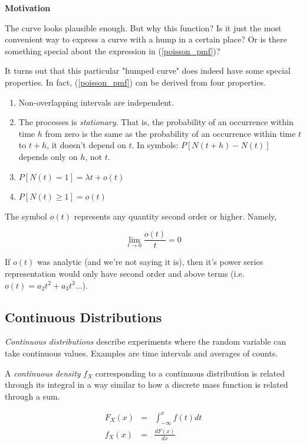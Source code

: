 \documentclass[]{article}
\begin{document}
\textbf{Motivation}

The curve looks plausible
enough.  But why this function?  Is it just the most
convenient way to express a curve with a hump in a certain
place?  Or is there something special about the expression
in (\ref{poisson_pmf})?

It turns out that this particular "humped curve" does indeed
have some special properties.  In fact, (\ref{poisson_pmf})
can be derived from four properties.

\begin{enumerate}

\item Non-overlapping intervals are independent.

\item The processes is \emph{stationary}.  That is,
  the probability of an occurrence within time $h$
  from zero is the same as the probability of an occurrence
  within time $t$ to $t + h$, it doesn't depend on $t$.
  In symbols: $P[N(t+h)-N(t)]$ depends only on $h$, not $t$.
  
\item $P[N(t) = 1] = \lambda t + o(t)$

\item $P[N(t) \ge 1] = o(t)$

\end{enumerate}

The symbol $o(t)$ represents any quantity second order or
higher.  Namely,

$$
\lim_{t \rightarrow 0} \frac{o(t)}{t} = 0
$$

If $o(t)$ was analytic (and we're not saying it is), then
it's power series representation would only have second
order and above terms (i.e. $o(t) = a_2t^2 + a_3t^3 \ldots$).

\subsection{Continuous Distributions}

\emph{Continuous distributions} describe experiments where
the random variable can take continuous values.  Examples
are time intervals and averages of counts.

A \emph{continuous density} $f_X$ corresponding to a continuous
distribution is related through its integral in a way similar to
how a discrete mass function is related through a sum.

\begin{eqnarray*}
F_X(x) & = & \int_{-\infty}^x f(t) dt \\
f_X(x) & = & \frac{dF(x)}{dx}
\end{eqnarray*}
\end{document}
